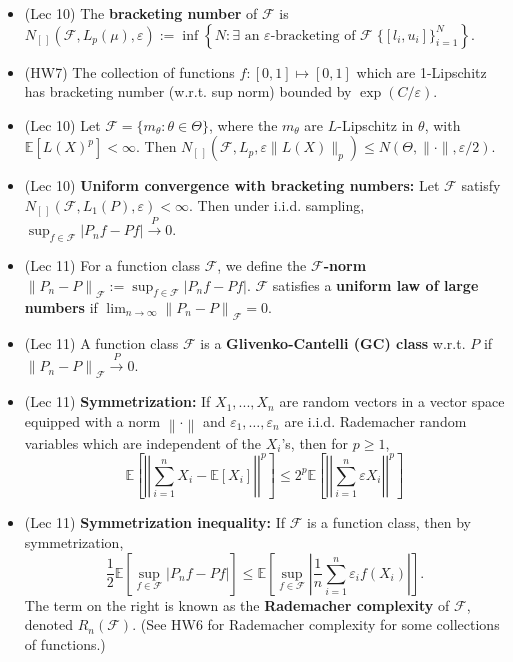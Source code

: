 \documentclass[twoside]{article}
\newcommand{\dis}{\displaystyle}
\newcommand{\norm}[1]{\left\|{#1}\right\|} %
\newcommand\bbE{\mathbb{E}}
\newcommand\calF{\mathcal{F}}
\def\eps{\varepsilon}
\def\t{\theta}
\newcommand\T{\Theta}
\newcommand\cp{\stackrel{P}{\goesto}}
\newcommand\goesto{\rightarrow}
\begin{document}
\begin{itemize}
\item (Lec 10) The \textbf{bracketing number} of $\calF$ is $N_{[\,]} (\calF, L_p(\mu), \eps) := \inf \left\{ N: \exists \text{ an } \eps\text{-bracketing of } \calF \; \{ [l_i, u_i] \}_{i=1}^N \right\}$.

\item (HW7) The collection of functions $f: [0,1] \mapsto [0,1]$ which are 1-Lipschitz has bracketing number (w.r.t. sup norm) bounded by $\exp(C / \eps)$.

\item (Lec 10) Let $\calF = \{ m_\t: \t \in \T \}$, where the $m_\t$ are $L$-Lipschitz in $\t$, with $\bbE[L(X)^p] < \infty$. Then $N_{[\,]} (\calF, L_p, \eps \|L(X)\|_p) \leq N(\T, \| \cdot \|, \eps / 2)$.

\item (Lec 10) \textbf{Uniform convergence with bracketing numbers:} Let $\calF$ satisfy $N_{[\,]} (\calF, L_1(P), \eps) < \infty$. Then under i.i.d. sampling, $\dis\sup_{f \in \calF} |P_n f - Pf| \cp 0$.

\item (Lec 11) For a function class $\calF$, we define the \textbf{$\calF$-norm} $\norm{P_n -P}_\calF := \dis\sup_{f \in \calF} |P_n f - Pf|$. $\calF$ satisfies a \textbf{uniform law of large numbers} if $\dis\lim_{n \goesto \infty} \norm{P_n - P}_\calF = 0$.

\item (Lec 11) A function class $\calF$ is a \textbf{Glivenko-Cantelli (GC) class} w.r.t. $P$ if $\norm{P_n - P}_\calF \cp 0$.

\item (Lec 11) \textbf{Symmetrization:} If $X_1,...,X_n$ are random vectors in a vector space equipped with a norm $\norm{\cdot}$ and $\eps_1,\dots,\eps_n$ are i.i.d. Rademacher random variables which are independent of the $X_i$'s, then for $p \geq 1$,
\begin{equation*}
\bbE \left[ \left| \left| \sum_{i=1}^n X_i - \bbE[X_i] \right| \right|^p \right] \leq 2^p \bbE \left[ \left| \left| \sum_{i=1}^n \eps X_i \right| \right|^p \right]
\end{equation*}

\item (Lec 11) \textbf{Symmetrization inequality:} If $\calF$ is a function class, then by symmetrization,
\begin{equation*}
\frac{1}{2}\bbE \left[\sup_{f \in \mathcal{F}} |P_n f - Pf| \right] \leq  \bbE \left[\sup_{f \in \calF} \left| \frac{1}{n} \sum_{i=1}^n \eps_i f(X_i) \right| \right].
\end{equation*}
The term on the right is known as the \textbf{Rademacher complexity} of $\mathcal{F}$, denoted $R_n(\calF)$. (See HW6 for Rademacher complexity for some collections of functions.)


\end{itemize}
\end{document}
